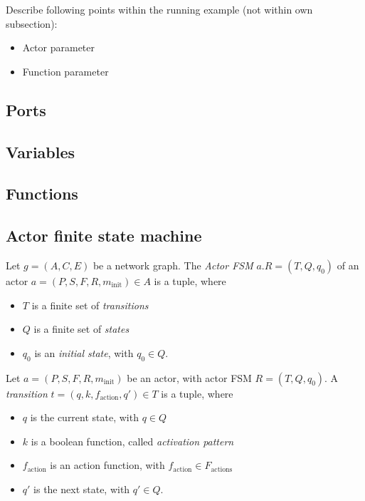 Describe following points within the running example (not within own subsection):
\begin{itemize}
\item Actor parameter
\item Function parameter
\end{itemize}

\subsection{Ports}

\subsection{Variables}

\subsection{Functions}

\subsection{Actor finite state machine}

\begin{definition}
Let $g=(A,C,E)$ be a network graph.
The \emph{Actor FSM} $a.R=(T,Q,q_0)$ of an actor $a=(P,S,F,R,m_\mathrm{init}) \in A$ is a tuple, where
\begin{itemize}
\item $T$ is a finite set of \emph{transitions}
\item $Q$ is a finite set of \emph{states}
\item $q_0$ is an \emph{initial state}, with $q_0\in Q$.
\end{itemize}
\end{definition}

\begin{definition}[Transition]
Let $a=(P,S,F,R,m_\mathrm{init})$ be an actor, with actor FSM $R=(T,Q,q_0)$.
A \emph{transition} $t=(q,k,f_\mathrm{action},q')\in T$ is a tuple, where
\begin{itemize}
\item $q$ is the current state, with $q \in Q$
\item $k$ is a boolean function, called \emph{activation pattern}
\item $f_\mathrm{action}$ is an action function, with $f_\mathrm{action}\in F_\mathrm{actions}$
\item $q'$ is the next state, with $q' \in Q$.
\end{itemize}
\end{definition}

